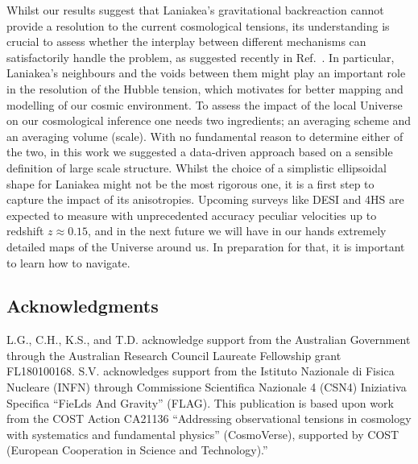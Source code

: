 \documentclass[notitlepage,nofootinbib]{revtex4-1}
\begin{document}
Whilst our results suggest that Laniakea's gravitational backreaction cannot provide a resolution to the current cosmological tensions, its understanding is crucial to assess whether the interplay between different mechanisms can satisfactorily handle the problem, as suggested recently in Ref.~\cite{Vagnozzi:2023nrq}.  In particular, Laniakea's neighbours and the voids between them might play an important role in the resolution of the Hubble tension, which motivates for better mapping and modelling of our cosmic environment. 
To assess the impact of the local Universe on our cosmological inference one needs two ingredients; an averaging scheme and an averaging volume (scale). With no fundamental reason to determine either of the two, in this work we suggested a data-driven approach based on a sensible definition of large scale structure. Whilst the choice of a simplistic ellipsoidal shape for Laniakea might not be the most rigorous one, it is a first step to capture the impact of its anisotropies. Upcoming surveys like DESI \cite{Saulder:2023oqm} and 4HS \cite{4HS} are expected to measure with unprecedented accuracy peculiar velocities up to redshift $z\approx 0.15$, and in the next future we will have in our hands extremely detailed maps of the Universe around us. In preparation for that, it is important to learn how to navigate.     

\subsection*{Acknowledgments}
\noindent L.G., C.H., K.S., and T.D. acknowledge support from the Australian Government through the Australian Research Council Laureate Fellowship grant FL180100168. S.V. acknowledges support from the Istituto Nazionale di Fisica Nucleare (INFN) through Commissione Scientifica Nazionale 4 (CSN4) Iniziativa Specifica ``FieLds And Gravity'' (FLAG). This publication is based upon work from the COST Action CA21136 ``Addressing observational tensions in cosmology with systematics and fundamental physics'' (CosmoVerse), supported by COST (European Cooperation in Science and Technology).”

\appendix
\end{document}
